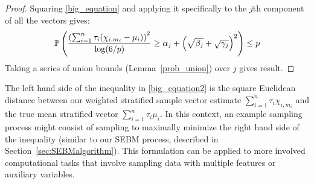 \begin{theorem}

\end{theorem}
\begin{proof}
Squaring \eqref{big_equation} and applying it specifically to the $j$th component of all the vectors gives:
\begin{equation*}
\operatorname{\mathbb{P}}\left(\frac{\left(\sum_{i=1}^n\tau_i(\chi_{i,m_i}-\mu_i)\right)^2}{\log(6/p)} 
\ge \alpha_{j} 
+ \left(\sqrt{\beta_{j}} 
+ \sqrt{\gamma_{j}}\right)^2  \right)
\le p 
\end{equation*}
Taking a series of union bounds (Lemma~\ref{prob_union}) over $j$ gives result.
\end{proof}

The left hand side of the inequality in \eqref{big_equation2} is the square Euclidean distance between our weighted stratified sample vector estimate $\sum_{i=1}^n\tau_i\chi_{i,m_i}$ and the true mean stratified vector $\sum_{i=1}^n\tau_i\mu_{i}$.
In this context, an example sampling process might consist of sampling to maximally minimize the right hand side of the inequality (similar to our SEBM process, described in Section~\ref{sec:SEBMalgorithm}).
This formulation can be applied to more involved computational tasks that involve sampling data with multiple features or auxiliary variables.


